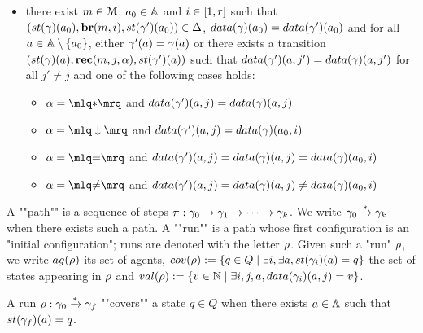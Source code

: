 \begin{definition}[Semantics]
\begin{itemize}
		\item there exist $m \in \mathcal{M}$, $a_0 \in \mathbb{A}$ and $i \in [1,r]$ such that $(\st{\config}(a_0),\br{\amessage}{i}, \st{\config'}(a_0)) \in \transitions$, $\data{\config}(a_0) = \data{\config'}(a_0)$ and for all $a \in \mathbb{A}\setminus \{a_0\}$, either $\gamma'(a) = \gamma(a)$ or there exists a transition $(\st{\config}(a),\rec{m}{j}{\anact},\st{\config'}(a))$
		such that $\data{\config'}(a, j') = \data{\config}(a, j')$ for all $j' \neq j$ and one of the following cases holds:
		\begin{itemize}
				\item $\anact = \quotemarks{\dummyact}$ 
				and $\data{\config'}(a,j) = \data{\config}(a,j)$
				\item $\anact = \quotemarks{\enregact}$ and $\data{\config'}(a,j) = \data{\config}(a_0,i)$
				\item $\anact = \quotemarks{\eqtestact}$ and $\data{\config'}(a,j) = \data{\config}(a,j) =\data{\config}(a_0,i)$
				\item $\anact = \quotemarks{\diseqtestact}$ and $\data{\config'}(a,j) = \data{\config}(a,j) \ne \data{\config}(a_0,i)$
			\end{itemize}
		\end{itemize}
	
	\AP A ""path"" is a sequence of steps $\pi : \gamma_0 \xrightarrow{} \gamma_1 \xrightarrow{} \cdots \xrightarrow{} \gamma_k$. 
	We write $\gamma_0 \xrightarrow{*} \gamma_k$ when there exists such a path.
	A ""run"" is a path whose first configuration is an "initial configuration"; runs are denoted with the letter $\rho$.  
	Given such a "run" $\rho$, we write $\agentsof{\run}$ its set of agents, $\statesin{\run}:= \set{q \in Q \mid \exists i, \exists a, \st{\config_i}(a) = q}$ the set of states appearing in $\rho$ and $\valsof{\run} := \set{\aval \in \nats \mid \exists i,j, a, \data{\config_i}(a,j) = \aval}$.  
	
	\AP A run $\rho: \gamma_0 \xrightarrow{*} \gamma_f$ ""covers"" a state $q \in Q$ when there exists $a \in \mathbb{A}$ such that $\st{\config_f}(a) = q$. 
\end{definition}
